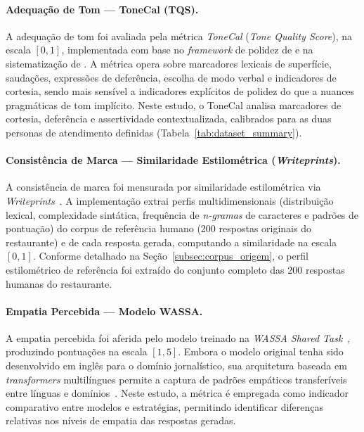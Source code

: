\documentclass[12pt, a4paper]{article}
\numberwithin{equation}{section}
\begin{document}
\paragraph{Adequação de Tom --- ToneCal (TQS).}
A adequação de tom foi avaliada pela métrica \textit{ToneCal} (\textit{Tone Quality Score}), na escala $[0, 1]$, implementada com base no \textit{framework} de polidez de  e na sistematização de . A métrica opera sobre marcadores lexicais de superfície, saudações, expressões de deferência, escolha de modo verbal e indicadores de cortesia, sendo mais sensível a indicadores explícitos de polidez do que a nuances pragmáticas de tom implícito. Neste estudo, o ToneCal analisa marcadores de cortesia, deferência e assertividade contextualizada, calibrados para as duas personas de atendimento definidas (Tabela~\ref{tab:dataset_summary}).

\paragraph{Consistência de Marca --- Similaridade Estilométrica (\textit{Writeprints}).}
A consistência de marca foi mensurada por similaridade estilométrica via \textit{Writeprints}~\cite{abbasi2008}. A implementação extrai perfis multidimensionais (distribuição lexical, complexidade sintática, frequência de \textit{n-gramas} de caracteres e padrões de pontuação) do corpus de referência humano (200 respostas originais do restaurante) e de cada resposta gerada, computando a similaridade na escala $[0, 1]$. Conforme detalhado  na  Seção~\ref{subsec:corpus_origem}, o perfil estilométrico de referência foi extraído do conjunto  completo das 200 respostas humanas do restaurante.

\paragraph{Empatia Percebida --- Modelo WASSA.}
A empatia percebida foi aferida pelo modelo treinado na \textit{WASSA Shared Task}~\cite{barriere2023}, produzindo pontuações na escala $[1, 5]$. Embora o modelo original tenha sido desenvolvido em inglês para o domínio jornalístico, sua arquitetura baseada em \textit{transformers} multilíngues permite a captura de padrões empáticos transferíveis entre línguas e domínios~\cite{barriere2023}. Neste estudo, a métrica é empregada como indicador comparativo entre modelos e estratégias, permitindo identificar diferenças relativas nos níveis de empatia das respostas geradas.
\end{document}
